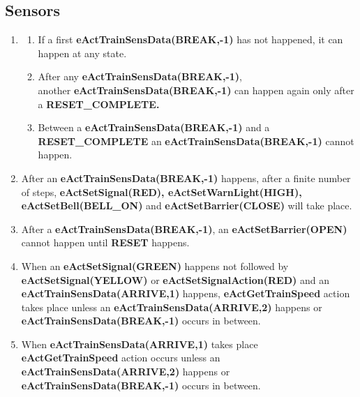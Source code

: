 \documentclass[10pt,a4paper]{article}
\begin{document}
\subsection{Sensors}
\begin{enumerate}
\item 
	\begin{enumerate}
	\item If a first \textbf{eActTrainSensData(BREAK,-1)} has not happened, it can happen at any state.
	\item After any \textbf{eActTrainSensData(BREAK,-1)},\\ another \textbf{eActTrainSensData(BREAK,-1)} can happen again only after a \textbf{RESET\_COMPLETE.}
    \item Between a \textbf{eActTrainSensData(BREAK,-1)} and a \textbf{RESET\_COMPLETE} an \textbf{eActTrainSensData(BREAK,-1)} cannot happen.
	\end{enumerate}
\item After an \textbf{eActTrainSensData(BREAK,-1)} happens, after a finite number of steps, \textbf{eActSetSignal(RED),  eActSetWarnLight(HIGH), eActSetBell(BELL\_ON)} and \textbf{eActSetBarrier(CLOSE)} will take place.
\item After a \textbf{eActTrainSensData(BREAK,-1)}, an \textbf{eActSetBarrier(OPEN)} cannot happen until \textbf{RESET} happens.
\item When an \textbf{eActSetSignal(GREEN)} happens not followed by \textbf{eActSetSignal(YELLOW)} or \textbf{eActSetSignalAction(RED)} and an \textbf{eActTrainSensData(ARRIVE,1)} happens, \textbf{eActGetTrainSpeed} action takes place unless an \textbf{eActTrainSensData(ARRIVE,2)} happens or\\ \textbf{eActTrainSensData(BREAK,-1)} occurs in between.
\item When \textbf{eActTrainSensData(ARRIVE,1)} takes place \textbf{eActGetTrainSpeed} action occurs unless an \textbf{eActTrainSensData(ARRIVE,2)} happens or \textbf{eActTrainSensData(BREAK,-1)} occurs in between.
\end{enumerate}
\end{document}
